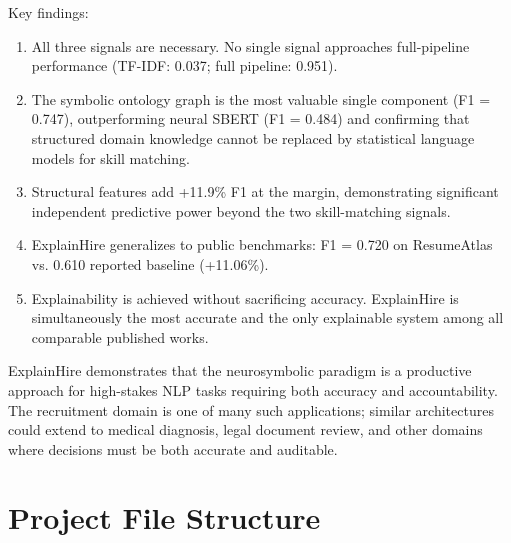 \documentclass[12pt,a4paper]{report}
\begin{document}
Key findings:
\begin{enumerate}
  \item All three signals are necessary. No single signal approaches full-pipeline performance (TF-IDF: 0.037; full pipeline: 0.951).
  \item The symbolic ontology graph is the most valuable single component (F1 = 0.747), outperforming neural SBERT (F1 = 0.484) and confirming that structured domain knowledge cannot be replaced by statistical language models for skill matching.
  \item Structural features add +11.9\% F1 at the margin, demonstrating significant independent predictive power beyond the two skill-matching signals.
  \item ExplainHire generalizes to public benchmarks: F1 = 0.720 on ResumeAtlas vs. 0.610 reported baseline (+11.06\%).
  \item Explainability is achieved without sacrificing accuracy. ExplainHire is simultaneously the most accurate and the only explainable system among all comparable published works.
\end{enumerate}

ExplainHire demonstrates that the neurosymbolic paradigm is a productive approach for high-stakes NLP tasks requiring both accuracy and accountability. The recruitment domain is one of many such applications; similar architectures could extend to medical diagnosis, legal document review, and other domains where decisions must be both accurate and auditable.

\appendix

\chapter{Project File Structure}
\end{document}
